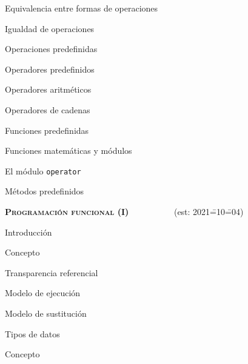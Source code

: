 \begin{longenum}
\begin{longenum}
\begin{longenum}
            \item Equivalencia entre formas de operaciones
            \item Igualdad de operaciones
        \end{longenum}
        \item Operaciones predefinidas
        \begin{longenum}
            \item Operadores predefinidos
            \begin{longenum}
                \item Operadores aritméticos
                \item Operadores de cadenas
            \end{longenum}
            \item Funciones predefinidas
            \begin{longenum}
                \item Funciones matemáticas y módulos
                \begin{longenum}
                    \item El módulo \texttt{operator}
                \end{longenum}
            \end{longenum}
            \item Métodos predefinidos
        \end{longenum}
    \end{longenum}
    \item \textbf{\textsc{Programación funcional (I)}} \ \ \ \ \ \ \ \ \ \ (est: 2021\==10\==04)
    \begin{longenum}
        \item Introducción
        \begin{longenum}
            \item Concepto
            \item Transparencia referencial
            \item Modelo de ejecución
            \begin{longenum}
                \item Modelo de sustitución
            \end{longenum}
        \end{longenum}
        \item Tipos de datos
        \begin{longenum}
            \item Concepto

\end{longenum}
\end{longenum}
\end{longenum}
